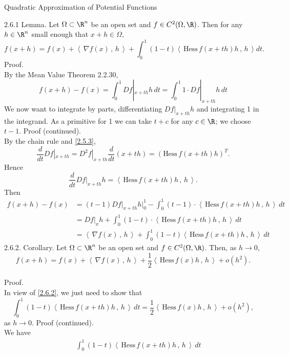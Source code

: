 \documentclass[smaller,hyperref={CJKbookmarks=true}]{beamer}
\newcommand{\scp}[2]{\left\langle\,#1\,,\,#2\,\right\rangle} \newcommand{\scpp}{\langle\,\cdot\,,\,\cdot\,\rangle}
\begin{document}
\begin{frame}{Quadratic Approximation of Potential Functions}
\begin{spacing}{1}
\alert{2.6.1 Lemma.} Let $\Omega\subset\R^n$ be an open set and $f\in C^2(\Omega,\R)$. Then for any $h\in\R^n$ small enough that $x+h\in\Omega$,
\begin{equation}\label{2.6.2}
f(x+h)=f(x)+\scp{\nabla f(x)}{h}+\int_{0}^{1}(1-t)\scp{\text{Hess}\,f(x+th)h}{h}dt.
\end{equation}
\alert{Proof.}\\
By the Mean Value Theorem 2.2.30,
\[f(x+h)-f(x)=\int_{0}^{1}Df|_{x+th}h\,dt=
\int_{0}^{1}1\cdot Df|_{x+th}h\,dt\]
We now want to integrate by parts, dif{}ferentiating $Df|_{x+th}h$ and integrating 1 in the integrand. As
a primitive for 1 we can take $t+c$ for any $c\in\R$; we choose $t-1$.
\newpage
\alert{Proof (continued).}\\
By the chain rule and \eqref{2.5.3},
\[\frac{d}{dt}Df|_{x+th}=D^2f|_{x+th}\frac{d}{dt}
(x+th)=(\text{Hess}\,f(x+th)h)^T.\]
Hence
\[\frac{d}{dt}Df|_{x+th}h=\scp{\text{Hess}\,f(x+th)h}{h}.\]
Then
\begin{equation*}
  \begin{split}
     f(x+h)-f(x) &=(t-1)Df|_{x+th}h\big|_0^1-\int_{0}^{1}(t-1)\cdot
     \scp{\text{Hess}\,f(x+th)h}{h}\,dt \\
       &=Df|_xh+\int_{0}^{1}(1-t)\cdot\scp{\text{Hess}\,f(x+th)h}{h}\,dt \\
       &=\scp{\nabla f(x)}{h}+\int_{0}^{1}(1-t)\scp{\text{Hess}\,f(x+th)h}{h}\,dt
  \end{split}
\end{equation*}
\newpage
\alert{2.6.2. Corollary.} Let $\Omega\subset\R^n$ be an open set and $f\in C^2(\Omega,\R)$. Then, as $h\to0$,
\begin{equation}\label{2.6.3}
  f(x+h)=f(x)+\scp{\nabla f(x)}{h}+\frac{1}{2}\scp{\text{Hess}\,f(x)h}{h}+o(h^2).
\end{equation}
 \\[12pt]
\alert{Proof.}\\
In view of \eqref{2.6.2}, we just need to show that
\[\int_{0}^{1}(1-t)\scp{\text{Hess}\,f(x+th)h}{h}\,dt
=\frac{1}{2}\scp{\text{Hess}\,f(x)h}{h}+o(h^2),\]
as $h\to0$.
\newpage
\alert{Proof (continued).}\\
We have
\begin{equation*}
  \begin{split}
       &~~~\int_{0}^{1}(1-t)\scp{\text{Hess}\,f(x+th)h}{h}\,dt  \\

\end{split}
\end{equation*}
\end{spacing}
\end{frame}
\end{document}
